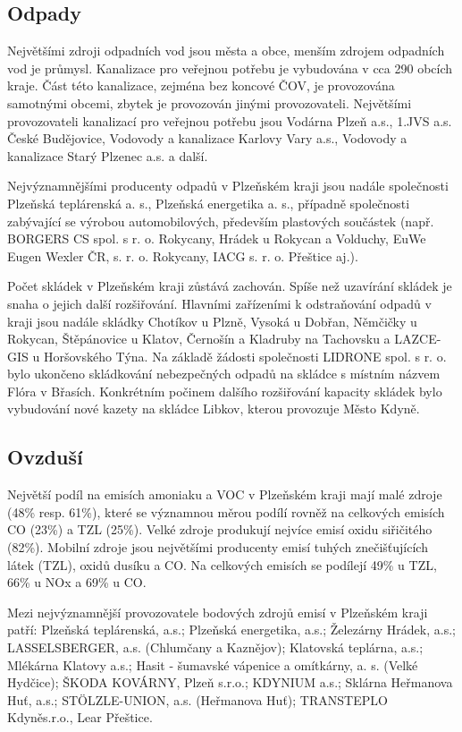 \documentclass[12pt]{article} %
\begin{document}
\subsection{Odpady}
Největšími zdroji odpadních vod jsou města a obce, menším zdrojem odpadních vod je 
průmysl. Kanalizace pro veřejnou potřebu je vybudována v cca 290 obcích kraje. Část 
této kanalizace, zejména bez koncové ČOV, je provozována samotnými obcemi, zbytek je 
provozován jinými provozovateli. Největšími provozovateli kanalizací pro veřejnou potřebu 
jsou Vodárna Plzeň a.s., 1.JVS a.s. České Budějovice, Vodovody a kanalizace Karlovy Vary 
a.s., Vodovody a kanalizace Starý Plzenec a.s. a další.

Nejvýznamnějšími producenty odpadů v Plzeňském kraji jsou nadále společnosti Plzeňská 
teplárenská a. s., Plzeňská energetika a. s., případně společnosti zabývající se výrobou 
automobilových, především plastových součástek (např. BORGERS CS spol. s r. o. 
Rokycany, Hrádek u Rokycan a Volduchy, EuWe Eugen Wexler ČR, s. r. o. Rokycany, 
IACG s. r. o. Přeštice aj.).

Počet skládek v Plzeňském kraji zůstává zachován. Spíše než uzavírání skládek je snaha 
o jejich další rozšiřování. Hlavními zařízeními k odstraňování odpadů v kraji jsou nadále 
skládky Chotíkov u Plzně, Vysoká u Dobřan, Němčičky u Rokycan, Štěpánovice u Klatov, 
Černošín a Kladruby na Tachovsku a LAZCE-GIS u Horšovského Týna. Na základě žádosti 
společnosti LIDRONE spol. s r. o. bylo ukončeno skládkování nebezpečných odpadů na 
skládce s místním názvem Flóra v Břasích. Konkrétním počinem dalšího rozšiřování kapacity 
skládek bylo vybudování nové kazety na skládce Libkov, kterou provozuje Město Kdyně.

\subsection{Ovzduší}
Největší podíl na emisích amoniaku a VOC v Plzeňském kraji mají malé zdroje (48\% resp. 
61\%), které se významnou měrou podílí rovněž na celkových emisích CO (23\%) a TZL 
(25\%). Velké zdroje produkují nejvíce emisí oxidu siřičitého (82\%). Mobilní zdroje jsou 
největšími producenty emisí tuhých znečišťujících látek (TZL), oxidů dusíku a CO. Na 
celkových emisích se podílejí 49\% u TZL, 66\% u NOx a 69\% u CO.

Mezi nejvýznamnější provozovatele bodových zdrojů emisí v Plzeňském kraji patří: Plzeňská 
teplárenská, a.s.; Plzeňská energetika, a.s.; Železárny Hrádek, a.s.; LASSELSBERGER, 
a.s. (Chlumčany a Kaznějov); Klatovská teplárna, a.s.; Mlékárna Klatovy a.s.; Hasit - 
šumavské vápenice a omítkárny, a. s. (Velké Hydčice); ŠKODA KOVÁRNY, Plzeň s.r.o.; 
KDYNIUM a.s.; Sklárna Heřmanova Huť, a.s.; STÖLZLE-UNION, a.s. (Heřmanova Huť); 
TRANSTEPLO Kdyněs.r.o., Lear Přeštice.
\end{document}

